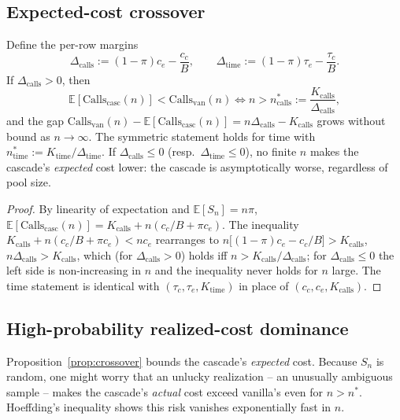 \subsection{Expected-cost crossover}
\begin{proposition}
\label{prop:crossover}
Define the per-row margins
\[
  \Delta_{\mathrm{calls}} := (1-\pi)c_e - \frac{c_c}{B}, \qquad
  \Delta_{\mathrm{time}} := (1-\pi)\tau_e - \frac{\tau_c}{B}.
\]
If $\Delta_{\mathrm{calls}} > 0$, then
\[
  \mathbb E[\mathrm{Calls}_{\mathrm{casc}}(n)] < \mathrm{Calls}_{\mathrm{van}}(n)
  \iff n > n^\ast_{\mathrm{calls}} := \frac{K_{\mathrm{calls}}}{\Delta_{\mathrm{calls}}},
\]
and the gap $\mathrm{Calls}_{\mathrm{van}}(n) - \mathbb E[\mathrm{Calls}_{\mathrm{casc}}(n)]
= n\Delta_{\mathrm{calls}} - K_{\mathrm{calls}}$ grows without bound as
$n\to\infty$. The symmetric statement holds for time with
$n^\ast_{\mathrm{time}} := K_{\mathrm{time}}/\Delta_{\mathrm{time}}$. If
$\Delta_{\mathrm{calls}} \le 0$ (resp.\ $\Delta_{\mathrm{time}}\le 0$), no
finite $n$ makes the cascade's \emph{expected} cost lower: the cascade is
asymptotically worse, regardless of pool size.
\end{proposition}
\begin{proof}
By linearity of expectation and $\mathbb E[S_n]=n\pi$,
$\mathbb E[\mathrm{Calls}_{\mathrm{casc}}(n)] = K_{\mathrm{calls}} + n(c_c/B + \pi c_e)$.
The inequality
$K_{\mathrm{calls}} + n(c_c/B+\pi c_e) < n c_e$
rearranges to $n\bigl[(1-\pi)c_e - c_c/B\bigr] > K_{\mathrm{calls}}$, \ie
$n\Delta_{\mathrm{calls}} > K_{\mathrm{calls}}$, which (for
$\Delta_{\mathrm{calls}}>0$) holds iff $n > K_{\mathrm{calls}}/\Delta_{\mathrm{calls}}$;
for $\Delta_{\mathrm{calls}}\le 0$ the left side is non-increasing in
$n$ and the inequality never holds for $n$ large. The time statement is
identical with $(\tau_c,\tau_e,K_{\mathrm{time}})$ in place of
$(c_c,c_e,K_{\mathrm{calls}})$.
\end{proof}

\subsection{High-probability realized-cost dominance}
Proposition~\ref{prop:crossover} bounds the cascade's \emph{expected}
cost. Because $S_n$ is random, one might worry that an unlucky
realization -- an unusually ambiguous sample -- makes the cascade's
\emph{actual} cost exceed vanilla's even for $n>n^\ast$. Hoeffding's
inequality shows this risk vanishes exponentially fast in $n$.

